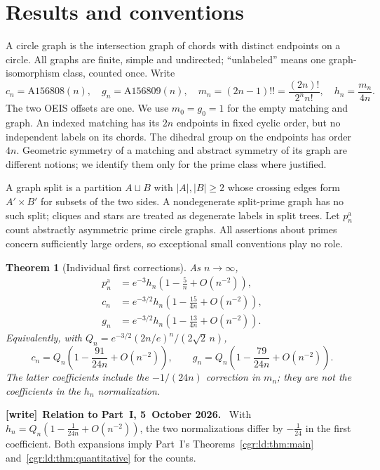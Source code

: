 \documentclass[11pt,letterpaper]{article}
\numberwithin{equation}{section}
\newtheorem{theorem}{Theorem}[section]
\theoremstyle{definition}\newtheorem{definition}[theorem]{Definition}
\theoremstyle{remark}\newtheorem{remark}[theorem]{Remark}
\newenvironment{writenote}[1][]{\par\smallskip\begingroup\small
 \noindent\textbf{[write]}\if\relax\detokenize{#1}\relax\else~\textbf{#1.}\fi\ }%
 {\par\endgroup\smallskip}
\begin{document}
\section{Results and conventions}\label{cgr:fc:sec:results}
A circle graph is the intersection graph of chords with distinct
endpoints on a circle. All graphs are finite, simple and undirected;
``unlabeled'' means one graph-isomorphism class, counted once.
Write
\[
 c_n=\mathrm{A156808}(n),\quad g_n=\mathrm{A156809}(n),\quad
 m_n=(2n-1)!!=\frac{(2n)!}{2^n n!},\quad h_n=\frac{m_n}{4n}.
\]
The two OEIS offsets are one. We use $m_0=g_0=1$ for the empty
matching and graph. An indexed matching has its $2n$ endpoints in
fixed cyclic order, but no independent labels on its chords. The
dihedral group on the endpoints has order $4n$. Geometric symmetry
of a matching and abstract symmetry of its graph are different
notions; we identify them only for the prime class where justified.

A graph split is a partition $A\sqcup B$ with $|A|,|B|\ge2$
whose crossing edges form $A'\times B'$ for subsets of the two
sides. A nondegenerate split-prime graph has no such split;
cliques and stars are treated as degenerate labels in split trees.
Let $p_n^{\mathrm a}$ count abstractly asymmetric prime circle
graphs. All assertions about primes concern sufficiently large
orders, so exceptional small conventions play no role.

\begin{theorem}[Individual first corrections]\label{cgr:fc:thm:main}
As $n\to\infty$,
\begin{align}
 p_n^{\mathrm a}&=e^{-3}h_n\left(1-\frac5n+O(n^{-2})\right),
 \label{cgr:fc:eq:prime-main}\\
 c_n&=e^{-3/2}h_n\left(1-\frac{15}{4n}+O(n^{-2})\right),
 \label{cgr:fc:eq:c-main}\\
 g_n&=e^{-3/2}h_n\left(1-\frac{13}{4n}+O(n^{-2})\right).
 \label{cgr:fc:eq:g-main}
\end{align}
Equivalently, with $Q_n=e^{-3/2}(2n/e)^n/(2\sqrt2\,n)$,
\[
 c_n=Q_n\left(1-\frac{91}{24n}+O(n^{-2})\right),\qquad
 g_n=Q_n\left(1-\frac{79}{24n}+O(n^{-2})\right).
\]
The latter coefficients include the $-1/(24n)$ correction in
$m_n$; they are not the coefficients in the $h_n$ normalization.
\end{theorem}
\begin{writenote}[Relation to Part~I, 5~October 2026]
With $h_n=Q_n(1-\frac1{24n}+O(n^{-2}))$, the two normalizations differ by $-\frac1{24}$ in the first coefficient. Both expansions imply Part~I's Theorems~\ref{cgr:ld:thm:main} and~\ref{cgr:ld:thm:quantitative} for the counts.
\end{writenote}
\end{document}
